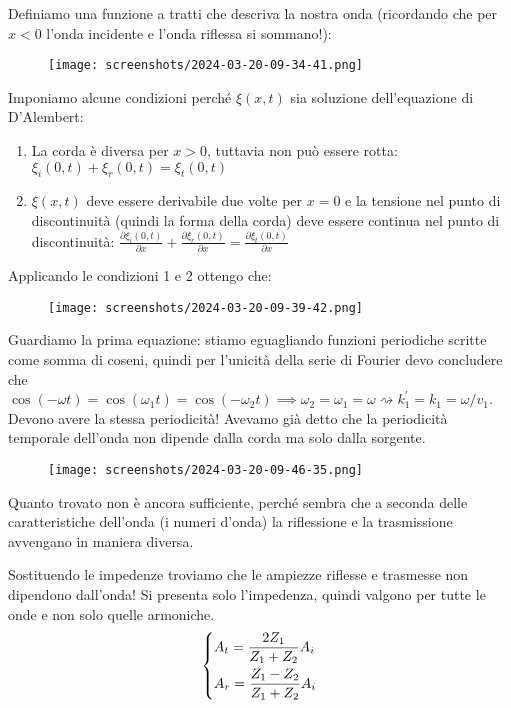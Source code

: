 Definiamo una funzione a tratti che descriva la nostra onda (ricordando che per \(x <0\) l'onda incidente e l'onda riflessa si sommano!):
\begin{figure}[H]
	\centering
	\texttt{[image: screenshots/2024-03-20-09-34-41.png]}
\end{figure}
Imponiamo alcune condizioni perché \(\xi (x,t)\) sia soluzione dell'equazione di D'Alembert:
\begin{enumerate}
	\item La corda è diversa per \(x>0\), tuttavia non può essere rotta: \(\xi_i(0,t) + \xi _r (0,t) = \xi _t (0,t)\)
	\item \(\xi (x,t)\) deve essere derivabile due volte per \(x=0\) e la tensione nel punto di discontinuità (quindi la forma della corda) deve essere continua nel punto di discontinuità: \(\frac{\partial \xi _i (0,t)}{\partial x} + \frac{\partial \xi _r ( 0,t)}{\partial x} = \frac{\partial \xi _t (0,t)}{\partial x}  \)    
\end{enumerate}
Applicando le condizioni 1 e 2 ottengo che:
\begin{figure}[H]
	\centering
	\texttt{[image: screenshots/2024-03-20-09-39-42.png]}
\end{figure}
Guardiamo la prima equazione: stiamo eguagliando funzioni periodiche scritte come somma di coseni, quindi per l'unicità della serie di Fourier devo concludere che \(\cos (-\omega t) = \cos (\omega _1 t) = \cos (-\omega _2 t) \implies \omega _2 = \omega _1 = \omega \rightsquigarrow k_1^{\prime} =k_1 = \omega /v_1\). Devono avere la stessa periodicità! Avevamo già detto che la periodicità temporale dell'onda non dipende dalla corda ma solo dalla sorgente.
\begin{figure}[H]
	\centering
	\texttt{[image: screenshots/2024-03-20-09-46-35.png]}
\end{figure}
Quanto trovato non è ancora sufficiente, perché sembra che a seconda delle caratteristiche dell'onda (i numeri d'onda) la riflessione e la trasmissione avvengano in maniera diversa.
\begin{formula}
	Sostituendo le impedenze troviamo che le ampiezze riflesse e trasmesse non dipendono dall'onda! Si presenta solo l'impedenza, quindi valgono per tutte le onde e non solo quelle armoniche.
	\[
		\begin{dcases}
			A_t = \frac{2Z_1}{Z_1 + Z_2}A_i\\
			A_r = \frac{Z_1 - Z_2}{Z_1 + Z_2}A_i\\
		\end{dcases}
	\]
\end{formula}
